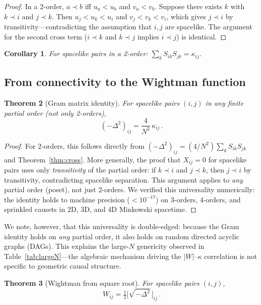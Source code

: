\documentclass[aps,prd,twocolumn,superscriptaddress,nofootinbib]{revtex4-2}
\newtheorem{theorem}{Theorem}
\newtheorem{corollary}[theorem]{Corollary}
\begin{document}
\begin{proof}
In a 2-order, $a \prec b$ iff $u_a < u_b$ and $v_a < v_b$. Suppose there exists $k$ with $k \prec i$ and $j \prec k$. Then $u_j < u_k < u_i$ and $v_j < v_k < v_i$, which gives $j \prec i$ by transitivity---contradicting the assumption that $i, j$ are spacelike. The argument for the second cross term ($i \prec k$ and $k \prec j$ implies $i \prec j$) is identical.
\end{proof}

\begin{corollary}
For spacelike pairs in a 2-order: $\sum_k S_{ik} S_{jk} = \kappa_{ij}$.
\end{corollary}

\subsection{From connectivity to the Wightman function}

\begin{theorem}[Gram matrix identity]
\label{thm:gram}
For spacelike pairs $(i,j)$ in any finite partial order (not only 2-orders),
\begin{equation}
(-\Delta^2)_{ij} = \frac{4}{N^2}\,\kappa_{ij}\,.
\end{equation}
\end{theorem}

\begin{proof}
For 2-orders, this follows directly from $(-\Delta^2)_{ij} = (4/N^2) \sum_k S_{ik} S_{jk}$ and Theorem~\ref{thm:cross}. More generally, the proof that $X_{ij} = 0$ for spacelike pairs uses only \emph{transitivity} of the partial order: if $k \prec i$ and $j \prec k$, then $j \prec i$ by transitivity, contradicting spacelike separation. This argument applies to \emph{any} partial order (poset), not just 2-orders. We verified this universality numerically: the identity holds to machine precision ($< 10^{-17}$) on 3-orders, 4-orders, and sprinkled causets in 2D, 3D, and 4D Minkowski spacetime.
\end{proof}

We note, however, that this universality is double-edged: because the Gram identity holds on \emph{any} partial order, it also holds on random directed acyclic graphs (DAGs). This explains the large-$N$ genericity observed in Table~\ref{tab:largeN}---the algebraic mechanism driving the $|W|$--$\kappa$ correlation is not specific to geometric causal structure.

\begin{theorem}[Wightman from square root]
\label{thm:sqrt}
For spacelike pairs $(i,j)$,
\begin{equation}
W_{ij} = \tfrac{1}{2}\bigl[\sqrt{-\Delta^2}\,\bigr]_{ij}\,.
\end{equation}
\end{theorem}
\end{document}
